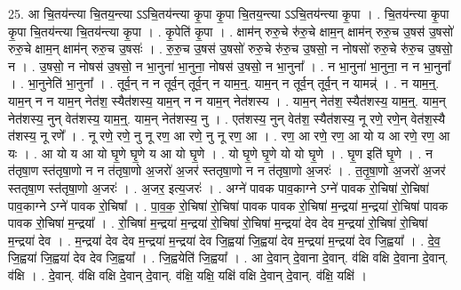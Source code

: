 \documentclass[17pt]{extarticle}
\begin{document}
25. आ चि॒तय॑न्त्या चि॒तय॒न्त्या ऽऽचि॒तय॑न्त्या कृ॒पा कृ॒पा चि॒तय॒न्त्या ऽऽचि॒तय॑न्त्या कृ॒पा । . चि॒तय॑न्त्या कृ॒पा कृ॒पा चि॒तय॑न्त्या चि॒तय॑न्त्या कृ॒पा । . कृ॒पेति॑ कृ॒पा । . क्षाम॑न् रुरु॒चे रु॑रु॒चे क्षाम॒न् क्षाम॑न् रुरु॒च उ॒षस॑ उ॒षसो॑ रुरु॒चे क्षाम॒न् क्षाम॑न् रुरु॒च उ॒षसः॑ । . रु॒रु॒च उ॒षस॑ उ॒षसो॑ रुरु॒चे रु॑रु॒च उ॒षसो॒ न नोषसो॑ रुरु॒चे रु॑रु॒च उ॒षसो॒ न । . उ॒षसो॒ न नोषस॑ उ॒षसो॒ न भा॒नुना॑ भा॒नुना॒ नोषस॑ उ॒षसो॒ न भा॒नुना᳚ । . न भा॒नुना॑ भा॒नुना॒ न न भा॒नुना᳚ । . भा॒नुनेति॑ भा॒नुना᳚ । . तूर्व॒न् न न तूर्व॒न् तूर्व॒न् न याम॒न्॒. याम॒न् न तूर्व॒न् तूर्व॒न् न यामन्न्॑ । . न याम॒न्॒. याम॒न् न न याम॒न् नेत॑श॒ स्यैत॑शस्य॒ याम॒न् न न याम॒न् नेत॑शस्य । . याम॒न् नेत॑श॒ स्यैत॑शस्य॒ याम॒न्॒. याम॒न् नेत॑शस्य॒ नुन् वेत॑शस्य॒ याम॒न्॒. याम॒न् नेत॑शस्य॒ नु । . एत॑शस्य॒ नुन् वेत॑श॒ स्यैत॑शस्य॒ नू रणे॒ रणे॒न् वेत॑श॒स्यै त॑शस्य॒ नू रणे᳚ । . नू रणे॒ रणे॒ नु नू रण॒ आ रणे॒ नु नू रण॒ आ । . रण॒ आ रणे॒ रण॒ आ यो य आ रणे॒ रण॒ आ यः । . आ यो य आ यो घृ॒णे घृ॒णे य आ यो घृ॒णे । . यो घृ॒णे घृ॒णे यो यो घृ॒णे । . घृ॒ण इति॑ घृ॒णे । . न त॑तृषा॒ण स्त॑तृषा॒णो न न त॑तृषा॒णो अ॒जरो॑ अ॒जर॑ स्ततृषा॒णो न न त॑तृषा॒णो अ॒जरः॑ । . त॒तृ॒षा॒णो अ॒जरो॑ अ॒जर॑ स्ततृषा॒ण स्त॑तृषा॒णो अ॒जरः॑ । . अ॒जर॒ इत्य॒जरः॑ । . अग्ने॑ पावक पाव॒काग्ने ऽग्ने॑ पावक रो॒चिषा॑ रो॒चिषा॑ पाव॒काग्ने ऽग्ने॑ पावक रो॒चिषा᳚ । . पा॒व॒क॒ रो॒चिषा॑ रो॒चिषा॑ पावक पावक रो॒चिषा॑ म॒न्द्रया॑ म॒न्द्रया॑ रो॒चिषा॑ पावक पावक रो॒चिषा॑ म॒न्द्रया᳚ । . रो॒चिषा॑ म॒न्द्रया॑ म॒न्द्रया॑ रो॒चिषा॑ रो॒चिषा॑ म॒न्द्रया॑ देव देव म॒न्द्रया॑ रो॒चिषा॑ रो॒चिषा॑ म॒न्द्रया॑ देव । . म॒न्द्रया॑ देव देव म॒न्द्रया॑ म॒न्द्रया॑ देव जि॒ह्वया॑ जि॒ह्वया॑ देव म॒न्द्रया॑ म॒न्द्रया॑ देव जि॒ह्वया᳚ । . दे॒व॒ जि॒ह्वया॑ जि॒ह्वया॑ देव देव जि॒ह्वया᳚ । . जि॒ह्वयेति॑ जि॒ह्वया᳚ । . आ दे॒वान् दे॒वाना दे॒वान्. व॑क्षि वक्षि दे॒वाना दे॒वान्. व॑क्षि । . दे॒वान्. व॑क्षि वक्षि दे॒वान् दे॒वान्. व॑क्षि॒ यक्षि॒ यक्षि॑ वक्षि दे॒वान् दे॒वान्. व॑क्षि॒ यक्षि॑ । \newline
\pagebreak
{}
\end{document}
